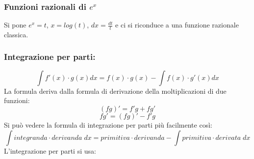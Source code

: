 \documentclass[a4paper, 9pt]{report}
\begin{document}
\subsubsection*{Funzioni razionali di $e^x$}
Si pone $e^x = t$, $x= log(t)$, $dx = \frac{dt}{t}$ e ci si riconduce a una funzione razionale classica.
\subsubsection*{Integrazione per parti:}
\[
    \int f'(x) \cdot  g(x) dx = f(x) \cdot g(x) - \int f(x) \cdot g'(x)dx
\]
La formula deriva dalla formula di derivazione della moltiplicazioni di due funzioni:
\[
    (fg)' = f'g + fg'
\]
\[
    fg' = (fg)' - f'g
\]
Si può vedere la formula di integrazione per parti più facilmente così:
\[
    \int integranda \cdot derivanda \; dx = primitiva \cdot derivanda - \int primitiva \cdot derivata \; dx
\]
L'integrazione per parti si usa:
\end{document}
